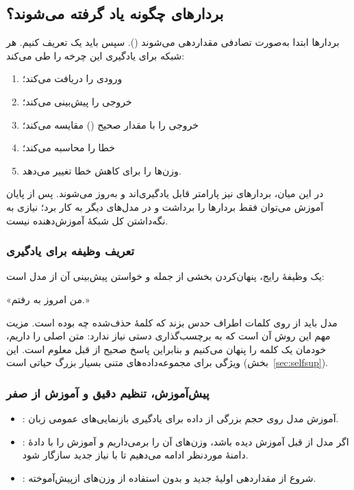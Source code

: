 \subsection{بردارهای  چگونه یاد گرفته می‌شوند؟}
بردارها ابتدا به‌صورت تصادفی مقداردهی می‌شوند (). سپس باید یک  تعریف کنیم. هر شبکه برای یادگیری این چرخه را طی می‌کند:
\begin{enumerate}
  \item ورودی را دریافت می‌کند؛
  \item خروجی را پیش‌بینی می‌کند؛
  \item خروجی را با مقدار صحیح () مقایسه می‌کند؛
  \item خطا را محاسبه می‌کند؛
  \item وزن‌ها را برای کاهش خطا تغییر می‌دهد.
\end{enumerate}
در این میان، بردارهای  نیز پارامتر قابل یادگیری‌اند و به‌روز می‌شوند. پس از پایان آموزش می‌توان فقط بردارها را برداشت و در مدل‌های دیگر به کار برد؛ نیازی به نگه‌داشتن کل شبکهٔ آموزش‌دهنده نیست.

\subsubsection{تعریف وظیفه برای یادگیری}
یک وظیفهٔ رایج، پنهان‌کردن بخشی از جمله و خواستن پیش‌بینی آن از مدل است:
\begin{center}
«من امروز به \eng{[MASK]} رفتم.»
\end{center}
مدل باید از روی کلمات اطراف حدس بزند که کلمهٔ حذف‌شده چه بوده است. مزیت مهم این روش آن است که به برچسب‌گذاری دستی نیاز ندارد: متن اصلی را داریم، خودمان یک کلمه را پنهان می‌کنیم و بنابراین پاسخ صحیح از قبل معلوم است. این ویژگی برای مجموعه‌داده‌های متنی بسیار بزرگ حیاتی است (بخش~\ref{sec:selfsup}).

\subsubsection{پیش‌آموزش، تنظیم دقیق و آموزش از صفر}
\begin{itemize}
  \item {}: آموزش مدل روی حجم بزرگی از داده برای یادگیری بازنمایی‌های عمومی زبان.
  \item {}: اگر مدل از قبل آموزش دیده باشد، وزن‌های آن را برمی‌داریم و آموزش را با دادهٔ دامنهٔ موردنظر ادامه می‌دهیم تا با نیاز جدید سازگار شود.
  \item {}: شروع از مقداردهی اولیهٔ جدید و بدون استفاده از وزن‌های ازپیش‌آموخته.
\end{itemize}

